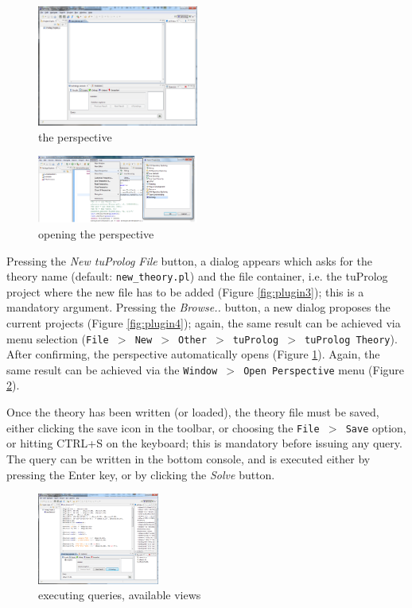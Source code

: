 \begin{figure}
  \includegraphics[width=200px]{images/plugin5.png}
  \caption{the \tuprolog{} perspective}\label{fig:plugin5}
\end{figure}

\begin{figure}
  \includegraphics[width=200px]{images/plugin6.png}
  \caption{opening the \tuprolog{} perspective}\label{fig:plugin6}
\end{figure}

Pressing the \textit{New tuProlog File} button, a dialog appears which asks for the theory name (default: \texttt{new\_theory.pl}) and the file container, i.e. the tuProlog project where the new file has to be added (Figure \ref{fig:plugin3}); this is a mandatory argument. Pressing the \textit{Browse..} button, a new dialog proposes the current \tuprolog{} projects (Figure \ref{fig:plugin4}); again, the same result can be achieved via menu selection  (\texttt{File $>$ New $>$ Other $>$ tuProlog $>$ tuProlog Theory}). After confirming, the \tuprolog{} perspective automatically opens (Figure \ref{fig:plugin5}). Again, the same result can be achieved via the \texttt{Window $>$ Open Perspective} menu (Figure \ref{fig:plugin6}).

Once the theory has been written (or loaded), the theory file must be saved, either clicking the save icon in the toolbar, or choosing the \texttt{File $>$ Save} option, or hitting CTRL+S on the keyboard; this is mandatory before issuing any query.
The query can be written in the bottom console, and is executed either by pressing the Enter key, or by clicking the \textit{Solve} button.


\begin{figure}
  \includegraphics[width=4cm]{images/plugin7.png}
  \caption{executing queries, available views}\label{fig:plugin7}
\end{figure}

